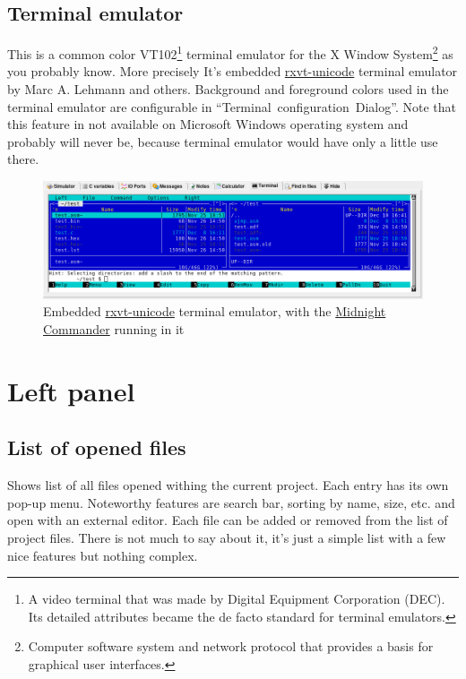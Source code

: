 \documentclass[a4paper,twoside,12pt]{book}
\begin{document}
		\subsection{Terminal emulator}
			This is a common color VT102\footnote{A video terminal that was made by Digital Equipment Corporation (DEC). Its detailed attributes became the de facto standard for terminal emulators.} terminal emulator for the X Window System\footnote{Computer software system and network protocol that provides a basis for graphical user interfaces.} as you probably know. More precisely It's embedded \href{http://software.schmorp.de/pkg/rxvt-unicode.html}{rxvt-unicode} terminal emulator by Marc A. Lehmann and others. Background and foreground colors used in the terminal emulator are configurable in ``Terminal~configuration~Dialog''. Note that this feature in not available on Microsoft\textregistered{} Windows\textregistered{} operating system and probably will never be, because terminal emulator would have only a little use there.
			\begin{figure}[h!]
				\centering{}
				\includegraphics[width=\textwidth]{img/031.png}
				\caption{Embedded \href{http://software.schmorp.de/pkg/rxvt-unicode.html}{rxvt-unicode} terminal emulator, with the \href{http://www.midnight-commander.org/}{Midnight Commander} running in it}
			\end{figure}

	\section{Left panel}
		\subsection{List of opened files}
			Shows list of all files opened withing the current project. Each entry has its own pop-up menu. Noteworthy features are search bar, sorting by name, size, etc. and open with an external editor. Each file can be added or removed from the list of project files. There is not much to say about it, it's just a simple list with a few nice features but nothing complex.
\end{document}
